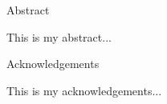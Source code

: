 \documentclass[a4paper, 12pt, oneside]{book}
\begin{document}
\pagebreak
\hspace{0pt}
\vfill %
    \begin{center}
    Abstract
    \end{center}
This is my abstract...
\vfill
\pagebreak

\pagebreak
\hspace{0pt}
\vfill 
    \begin{center}
    Acknowledgements
    \end{center}
This is my acknowledgements...

\vfill
\pagebreak


\tableofcontents
\listoffigures 
\listoftables

\clearpage








\printbibliography


\end{document}
